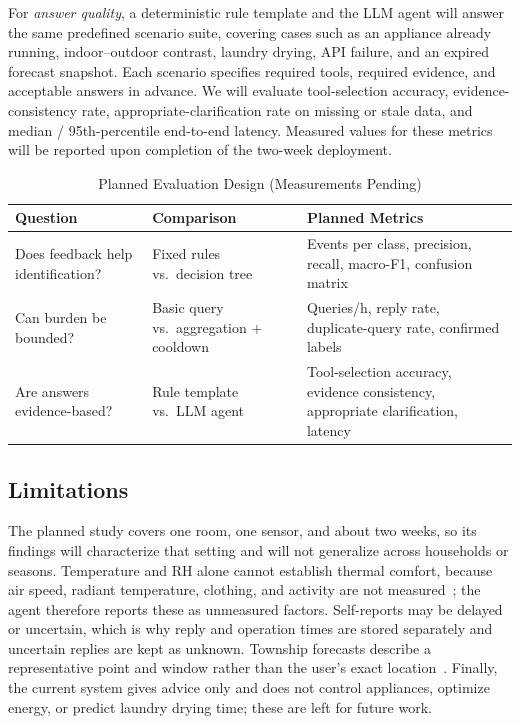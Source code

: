 For \emph{answer quality}, a deterministic rule template and the LLM agent will answer the same predefined scenario suite, covering cases such as an appliance already running, indoor--outdoor contrast, laundry drying, API failure, and an expired forecast snapshot. Each scenario specifies required tools, required evidence, and acceptable answers in advance. We will evaluate tool-selection accuracy, evidence-consistency rate, appropriate-clarification rate on missing or stale data, and median / 95th-percentile end-to-end latency. Measured values for these metrics will be reported upon completion of the two-week deployment.

\begin{table}[t]
\caption{Planned Evaluation Design (Measurements Pending)}
\label{tab:eval}
\centering
\footnotesize
\setlength{\tabcolsep}{3pt}
\begin{tabular}{@{}>{\raggedright}p{1.9cm}>{\raggedright}p{2.35cm}>{\raggedright\arraybackslash}p{3.6cm}@{}}
\toprule
Question & Comparison & Planned Metrics \\
\midrule
Does feedback help identification? & Fixed rules vs.\ decision tree & Events per class, precision, recall, macro-F1, confusion matrix \\
Can burden be bounded? & Basic query vs.\ aggregation + cooldown & Queries/h, reply rate, duplicate-query rate, confirmed labels \\
Are answers evidence-based? & Rule template vs.\ LLM agent & Tool-selection accuracy, evidence consistency, appropriate clarification, latency \\
\bottomrule
\end{tabular}
\end{table}



\subsection{Limitations}
The planned study covers one room, one sensor, and about two weeks, so its findings will characterize that setting and will not generalize across households or seasons. Temperature and RH alone cannot establish thermal comfort, because air speed, radiant temperature, clothing, and activity are not measured~\cite{ashrae55}; the agent therefore reports these as unmeasured factors. Self-reports may be delayed or uncertain, which is why reply and operation times are stored separately and uncertain replies are kept as unknown. Township forecasts describe a representative point and window rather than the user's exact location~\cite{cwa_township}. Finally, the current system gives advice only and does not control appliances, optimize energy, or predict laundry drying time; these are left for future work.
